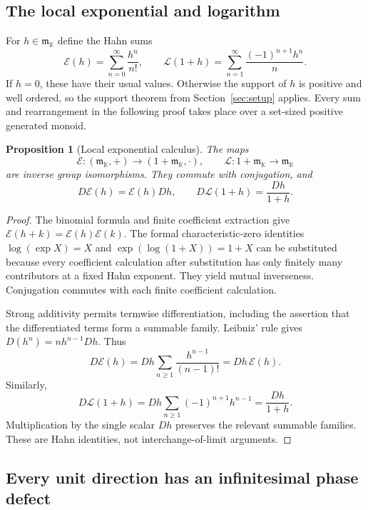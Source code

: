 \documentclass[11pt,a4paper]{article}
\numberwithin{equation}{section}
\newtheorem{proposition}[theorem]{Proposition}
\theoremstyle{definition}
\theoremstyle{remark}
\newcommand{\K}{\mathbb K}
\newcommand{\mm}{\mathfrak m}
\newcommand{\EE}{\mathcal E}
\newcommand{\LL}{\mathcal L}
\begin{document}
\subsection{The local exponential and logarithm}

For $h\in\mm_\K$ define the Hahn sums
\begin{equation}\label{eq:local-functions}
 \EE(h)=\sum_{n=0}^{\infty}\frac{h^n}{n!},\qquad
 \LL(1+h)=\sum_{n=1}^{\infty}\frac{(-1)^{n+1}h^n}{n}.
\end{equation}
If $h=0$, these have their usual values. Otherwise the support of $h$ is
positive and well ordered, so the support theorem from
Section~\ref{sec:setup} applies. Every sum and rearrangement in the following
proof takes place over a set-sized positive generated monoid.

\begin{proposition}[Local exponential calculus]\label{prop:local-exp}
The maps
\[
 \EE:(\mm_\K,+)\longrightarrow(1+\mm_\K,\cdot),\qquad
 \LL:1+\mm_\K\longrightarrow\mm_\K
\]
are inverse group isomorphisms. They commute with conjugation, and
\begin{equation}\label{eq:Dlocal}
 D\EE(h)=\EE(h)Dh,\qquad
 D\LL(1+h)=\frac{Dh}{1+h}.
\end{equation}
\end{proposition}
\begin{proof}
The binomial formula and finite coefficient extraction give
$\EE(h+k)=\EE(h)\EE(k)$. The formal characteristic-zero identities
$\log(\exp X)=X$ and $\exp(\log(1+X))=1+X$ can be substituted because
every coefficient calculation after substitution has only finitely many
contributors at a fixed Hahn exponent. They yield mutual inverseness.
Conjugation commutes with each finite coefficient calculation.

Strong additivity permits termwise differentiation, including the assertion
that the differentiated terms form a summable family. Leibniz' rule gives
$D(h^n)=n h^{n-1}Dh$. Thus
\[
 D\EE(h)=Dh\sum_{n\geq1}\frac{h^{n-1}}{(n-1)!}=Dh\,\EE(h).
\]
Similarly,
\[
 D\LL(1+h)=Dh\sum_{n\geq1}(-1)^{n+1}h^{n-1}
           =\frac{Dh}{1+h}.
\]
Multiplication by the single scalar $Dh$ preserves the relevant summable
families. These are Hahn identities, not interchange-of-limit arguments.
\end{proof}

\subsection{Every unit direction has an infinitesimal phase defect}
\end{document}
